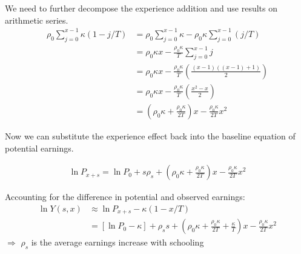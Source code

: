 \begin{frame}
We need to further decompose the experience addition and use results on arithmetic series.
\begin{align*}
\rho_0\sum_{j=0}^{x - 1} \kappa \left(1 - j/T\right) & = \rho_0 \sum_{j=0}^{x - 1} \kappa - \rho_0\kappa \sum_{j=0}^{x - 1} \left(j/T\right)\\
    & = \rho_0 \kappa x - \frac{\rho_0\kappa}{T} \sum_{j=0}^{x - 1} j\\
    & = \rho_0 \kappa x - \frac{\rho_0\kappa}{T} \left(\frac{(x - 1)((x - 1) + 1)}{2}\right) \\
    & = \rho_0 \kappa x - \frac{\rho_0\kappa}{T} \left(\frac{x^2 - x}{2}\right) \\
    & = \left(\rho_0 \kappa + \frac{\rho_0\kappa}{2T}\right) x - \frac{\rho_0\kappa}{2T} x^2
\end{align*}
\end{frame}
\begin{frame}
Now we can substitute the experience effect back into the baseline equation of potential earnings.

\begin{align*}
\ln{P_{x+s}} = \ln{P_0} + s \rho_s  + \left(\rho_0 \kappa + \frac{\rho_0\kappa}{2T}\right) x - \frac{\rho_0\kappa}{2T} x^2
\end{align*}
\end{frame}
\begin{frame}
Accounting for the difference in potential and observed earnings:
\begin{align*}
\ln{Y(s, x)} & \approx \ln{P_{x + s}} - \kappa\left(1 - x/T\right) \\
            & = [\ln{P_0} - \kappa] + \rho_s s + \left(\rho_0\kappa + \frac{\rho_0\kappa}{2T} + \frac{\kappa}{T}\right) x - \frac{\rho_0\kappa}{2T}x^2
\end{align*}
$\Rightarrow$ $\rho_s$ is the average earnings increase with schooling
\end{frame}
